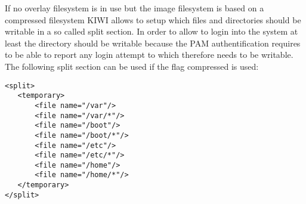 If no overlay filesystem is in use but the image filesystem is based on
a compressed filesystem KIWI allows to setup which files and directories
should be writable in a so called split section. In order to allow to
login into the system at least the  directory should be writable
because the PAM authentification requires to be able to report any login
attempt to  which therefore needs to be writable. The
following split section can be used if the flag compressed
is used:  

\begin{Command}{12cm}
\begin{verbatim}
<split>
   <temporary>
       <file name="/var"/>
       <file name="/var/*"/>
       <file name="/boot"/>
       <file name="/boot/*"/>
       <file name="/etc"/>
       <file name="/etc/*"/>
       <file name="/home"/>
       <file name="/home/*"/>
   </temporary>
</split>
\end{verbatim}
\end{Command}
